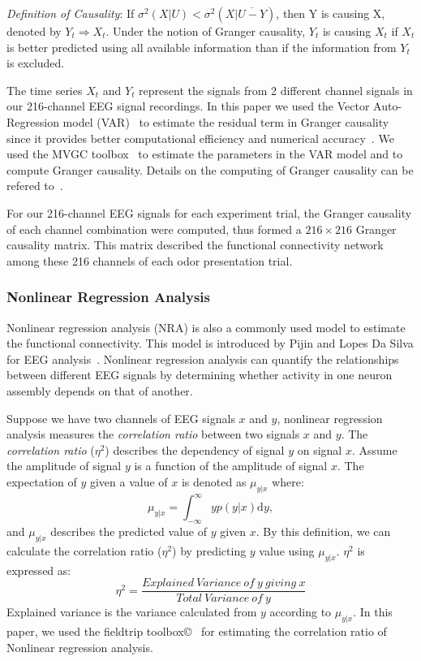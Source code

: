\emph{Definition of Causality}: If $\sigma^2(X|U)<\sigma^2(X|\overline{U-Y})$, then Y is causing X, denoted by $Y_t \Rightarrow X_t$. Under the notion of Granger causality, $Y_t$ is causing $X_t$ if $X_t$ is better predicted using all available information than if the information from $Y_t$ is excluded.

The time series $X_t$ and $Y_t$ represent the signals from 2 different channel signals in our 216-channel EEG signal recordings. In this paper we used the Vector Auto-Regression model (VAR)~\cite{barnett2014mvgc} to estimate the residual term in Granger causality since it provides better computational efficiency and numerical accuracy~\cite{barnett2014mvgc}. We used the MVGC toolbox~\cite{barnett2014mvgc} to estimate the parameters in the VAR model and to compute Granger causality. Details on the computing of Granger causality can be refered to~\cite{barnett2014mvgc}.

For our 216-channel EEG signals for each experiment trial, the Granger causality of each channel combination were computed, thus formed a $216 \times 216$ Granger causality matrix. This matrix described the functional connectivity network among these 216 channels of each odor presentation trial. 

\subsubsection{Nonlinear Regression Analysis}
Nonlinear regression analysis (NRA) is also a commonly used model to estimate the functional connectivity. This model is introduced by Pijin and Lopes Da Silva for EEG analysis~\cite{pijn1990localization}. Nonlinear regression analysis can quantify the relationships between different EEG signals by determining whether activity in one neuron assembly depends on that of another.


Suppose we have two channels of EEG signals $x$ and $y$, nonlinear regression analysis measures the \emph{correlation ratio} between two signals $x$ and $y$. The \emph{correlation ratio} ($\eta^2$) describes the dependency of signal $y$ on signal $x$. Assume the amplitude of signal $y$ is a function of the amplitude of signal $x$. The expectation of $y$ given a value of $x$ is denoted as $\mu_{y|x}$ where:
\begin{equation} \label{eq:regressioncurve}
\mu_{y|x} = \int_{-\infty}^{\infty} y p(y|x) \mathrm{d}y,
\end{equation}
and $\mu_{y|x}$ describes the predicted value of $y$ given $x$. By this definition, we can calculate the correlation ratio ($\eta^2$) by predicting $y$ value using $\mu_{y|x}$. $\eta^2$ is expressed as:
\begin{equation} \label{eq:NRAregression}
\eta^2 = \frac{Explained \ Variance \ of \ y \ giving \ x }{Total \ Variance \ of \ y}
\end{equation}
Explained variance is the variance calculated from $y$ according to $\mu_{y|x}$. In this paper, we used the fieldtrip toolbox\copyright~\cite{oostenveld2010fieldtrip} for estimating the correlation ratio of Nonlinear regression analysis. 

